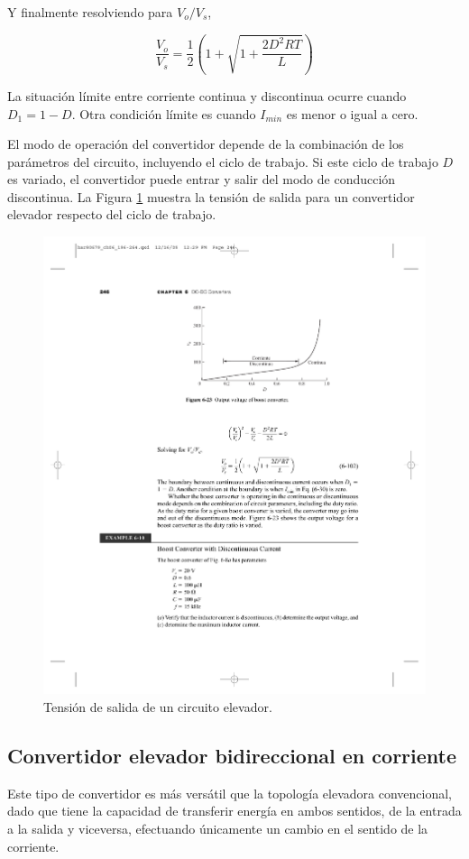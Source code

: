 Y finalmente resolviendo para $V_o / V_s$,

\begin{equation}
    \boxed{\frac{V_o}{V_s} = \frac{1}{2} \left(1 + \sqrt{1 + \frac{2 D^2 R T}{L}}\right)}
\end{equation}

La situación límite entre corriente continua y discontinua ocurre cuando $D_1 = 1 -D$. Otra condición límite es cuando $I_{min}$ es menor o igual a cero.

El modo de operación del convertidor depende de la combinación de los parámetros del circuito, incluyendo el ciclo de trabajo. Si este ciclo de trabajo $D$ es variado, el convertidor puede entrar y salir del modo de conducción discontinua. La Figura \ref{modo-conduccion-elevador} muestra la tensión de salida para un convertidor elevador respecto del ciclo de trabajo.

\begin{figure}[hbt!]
    \centering
    \includegraphics[width=0.55\columnwidth]{Imágenes/Convertidor elevador/Modo de conducción discontinua/Tension de salida respecto del ciclo de trabajo.pdf}
    \caption{Tensión de salida de un circuito elevador.}
    \label{modo-conduccion-elevador}
\end{figure}

\subsection{Convertidor elevador bidireccional en corriente}
\label{presentacion-convertidor}

Este tipo de convertidor es más versátil que la topología elevadora convencional, dado que tiene la capacidad de transferir energía en ambos sentidos, de la entrada a la salida y viceversa, efectuando únicamente un cambio en el sentido de la corriente.

